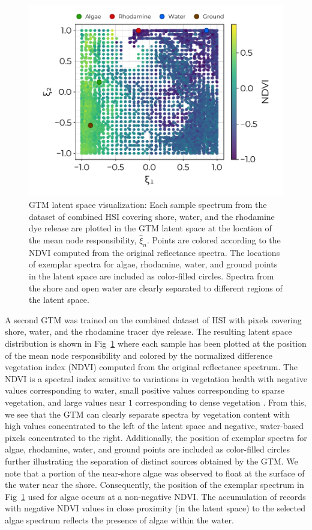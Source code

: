 \documentclass[remotesensing,article,submit,pdftex,moreauthors]{Definitions/mdpi}
\begin{document}
\begin{figure}[t]
\centering
\includegraphics[width=0.8\columnwidth]{paper/figures/results/square-ndvi.pdf}
\caption{GTM latent space visualization: Each sample spectrum from the dataset of combined HSI covering shore, water, and the rhodamine dye release are plotted in the GTM latent space at the location of the mean node responsibility, $\hat{\xi}_n$. Points are colored according to the NDVI computed from the original reflectance spectra. The locations of exemplar spectra for algae, rhodamine, water, and ground points in the latent space are included as color-filled circles. Spectra from the shore and open water are clearly separated to different regions of the latent space.\label{fig:gtm-ndvi}}
\end{figure}  

A second GTM was trained on the combined dataset of HSI with pixels covering shore, water, and the rhodamine tracer dye release. The resulting latent space distribution is shown in Fig~\ref{fig:gtm-ndvi} where each sample has been plotted at the position of the mean node responsibility and colored by the normalized difference vegetation index (NDVI) computed from the original reflectance spectrum. The NDVI is a spectral index sensitive to variations in vegetation health with negative values corresponding to water, small positive values corresponding to sparse vegetation, and large values near $1$ corresponding to dense vegetation \cite{thenkabail2018hyperspectral}. From this, we see that the GTM can clearly separate spectra by vegetation content with high values concentrated to the left of the latent space and negative, water-based pixels concentrated to the right. Additionally, the position of exemplar spectra for algae, rhodamine, water, and ground points are included as color-filled circles further illustrating the separation of distinct sources obtained by the GTM. We note that a portion of the near-shore algae was observed to float at the surface of the water near the shore. Consequently, the position of the exemplar spectrum in Fig~\ref{fig:gtm-ndvi} used for algae occurs at a non-negative NDVI. The accumulation of records with negative NDVI values in close proximity (in the latent space) to the selected algae spectrum reflects the presence of algae within the water.
\end{document}
